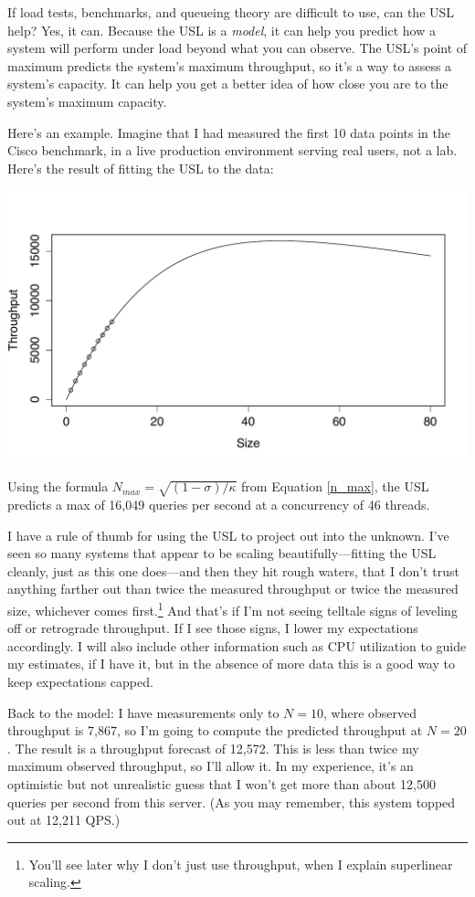 \documentclass{vivid_layout}
\begin{document}
If load tests, benchmarks, and queueing theory are difficult to use, can the USL
help? Yes, it can.  Because the USL is a {\itshape model}, it can help you
predict how a system will perform under load beyond what you can observe. The
USL's point of maximum predicts the system's maximum throughput, so it's a way
to assess a system's capacity.  It can help you get a better idea of how close
you are to the system's maximum capacity.

Here's an example. Imagine that I had measured the first 10 data points in the
Cisco benchmark, in a live production environment serving real users, not a
lab. Here's the result of fitting the USL to the data:
\begin{center}
\includegraphics[width=.85\linewidth]{scalability/cisco-2}
\end{center}

Using the formula $N_{max}=\sqrt{(1-\sigma)/\kappa}$ from Equation \ref{n_max}, the USL predicts a
max of 16,049 queries per second at a concurrency of 46 threads.

I have a rule of thumb for using the USL to project out into the unknown. I've
seen so many systems that appear to be scaling beautifully---fitting the
USL cleanly, just as this one does---and then they hit rough waters, that I don't trust
anything farther out than twice the measured throughput or twice the
measured size, whichever comes first.\footnote{You'll see later why I don't just
use throughput, when I explain superlinear scaling.} And that's if I'm not seeing
telltale signs of leveling off or retrograde throughput. If I see those signs, I
lower my expectations accordingly. I will also include other information such as
CPU utilization to guide my estimates, if I have it, but in the absence of more
data this is a good way to keep expectations capped.

Back to the model: I have measurements only to $N=10$, where observed throughput
is 7,867, so I'm going to compute the predicted throughput at $N=20$. The result
is a throughput forecast of 12,572. This is less than twice my maximum
observed throughput, so I'll allow it. In my experience, it's an optimistic but
not unrealistic guess that I won't get more than about 12,500 queries per second
from this server. (As you may remember, this system topped out at 12,211 QPS.)
\end{document}
